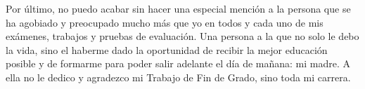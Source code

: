 Por último, no puedo acabar sin hacer una especial mención a la persona que se ha agobiado y preocupado mucho más que yo en todos y cada uno de mis exámenes, trabajos y pruebas de evaluación. Una persona a la que no solo le debo la vida, sino el haberme dado la oportunidad de recibir la mejor educación posible y de formarme para poder salir adelante el día de mañana: mi madre. A ella no le dedico y agradezco mi Trabajo de Fin de Grado, sino toda mi carrera.